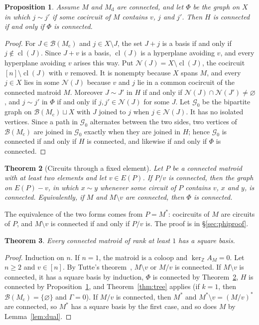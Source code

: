 \documentclass[11pt,a4paper]{article}
\theoremstyle{plain}
\newtheorem{theorem}{Theorem}[section]
\newtheorem{proposition}[theorem]{Proposition}
\theoremstyle{definition}
\newcommand{\Z}{\mathbb Z}
\newcommand{\kerZ}{\ker_{\Z}\!A_M}
\newcommand{\bs}{\mathcal B}
\newcommand{\cl}{\operatorname{cl}}
\begin{document}
\begin{proposition}\label{prop:phi}
Assume $M$ and $M_{\mathrm d}$ are connected, and let $\Phi$ be the graph on $X$ in which $j\sim j'$ if some cocircuit of $M$ contains $v$, $j$ and $j'$. Then $H$ is connected if and only if $\Phi$ is connected.
\end{proposition}
\begin{proof}
For $J\in\bs(M_{\mathrm c})$ and $j\in X\setminus J$, the set $J+j$ is a basis if and only if $j\notin\cl(J)$. Since $J+v$ is a basis, $\cl(J)$ is a hyperplane avoiding $v$, and every hyperplane avoiding $v$ arises this way. Put $\mathcal N(J)=X\setminus\cl(J)$, the cocircuit $[n]\setminus\cl(J)$ with $v$ removed. It is nonempty because $X$ spans $M$, and every $j\in X$ lies in some $\mathcal N(J)$ because $v$ and $j$ lie in a common cocircuit of the connected matroid $M$. Moreover $J\sim J'$ in $H$ if and only if $\mathcal N(J)\cap\mathcal N(J')\ne\varnothing$, and $j\sim j'$ in $\Phi$ if and only if $j,j'\in\mathcal N(J)$ for some $J$. Let $\mathcal G_0$ be the bipartite graph on $\bs(M_{\mathrm c})\sqcup X$ with $J$ joined to $j$ when $j\in\mathcal N(J)$. It has no isolated vertices. Since a path in $\mathcal G_0$ alternates between the two sides, two vertices of $\bs(M_{\mathrm c})$ are joined in $\mathcal G_0$ exactly when they are joined in $H$; hence $\mathcal G_0$ is connected if and only if $H$ is connected, and likewise if and only if $\Phi$ is connected.
\end{proof}

\begin{theorem}[Circuits through a fixed element]\label{thm:phi}
Let $P$ be a connected matroid with at least two elements and let $v\in E(P)$. If $P/v$ is connected, then the graph on $E(P)-v$, in which $x\sim y$ whenever some circuit of $P$ contains $v$, $x$ and $y$, is connected. Equivalently, if $M$ and $M\setminus v$ are connected, then $\Phi$ is connected.
\end{theorem}
The equivalence of the two forms comes from $P=M^*$: cocircuits of $M$ are circuits of $P$, and $M\setminus v$ is connected if and only if $P/v$ is. The proof is in \S\ref{sec:phiproof}.

\begin{theorem}\label{thm:cond}
Every connected matroid of rank at least $1$ has a square basis.
\end{theorem}
\begin{proof}
Induction on $n$. If $n=1$, the matroid is a coloop and $\kerZ=0$. Let $n\ge2$ and $v\in[n]$. By Tutte's theorem~\cite[Section~4.3]{Ox11}, $M\setminus v$ or $M/v$ is connected. If $M\setminus v$ is connected, it has a square basis by induction, $\Phi$ is connected by Theorem~\ref{thm:phi}, $H$ is connected by Proposition~\ref{prop:phi}, and Theorem~\ref{thm:tree} applies (if $k=1$, then $\bs(M_{\mathrm c})=\{\varnothing\}$ and $\Gamma=0$). If $M/v$ is connected, then $M^*$ and $M^*\setminus v=(M/v)^*$ are connected, so $M^*$ has a square basis by the first case, and so does $M$ by Lemma~\ref{lem:dual}.
\end{proof}
\end{document}
